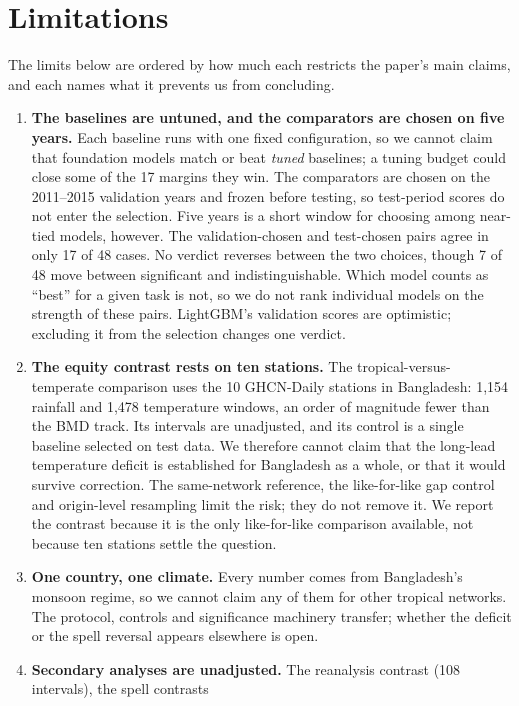 \section{Limitations}
\label{sec:limitations}

The limits below are ordered by how much each restricts the paper's main claims, and each names what it prevents
us from concluding.

\begin{enumerate}
  \item \textbf{The baselines are untuned, and the comparators are chosen on five years.} Each baseline runs with
    one fixed configuration, so we cannot claim that foundation models match or beat \emph{tuned} baselines; a
    tuning budget could close some of the 17 margins they win. The comparators are chosen on the 2011--2015
    validation years and frozen before testing, so test-period scores do not enter the selection. Five years is a
    short window for choosing among near-tied models, however. The validation-chosen and test-chosen pairs agree in
    only 17 of 48 cases. No verdict reverses between the two choices, though 7 of 48 move between significant and indistinguishable.
    Which model counts as ``best'' for a
    given task is not, so we do not rank individual models on the strength of these pairs. LightGBM's validation
    scores are optimistic; excluding it from the selection changes one verdict.
  \item \textbf{The equity contrast rests on ten stations.} The tropical-versus-temperate comparison uses the 10
    GHCN-Daily stations in Bangladesh: 1{,}154 rainfall and 1{,}478 temperature windows, an order of magnitude
    fewer than the BMD track. Its intervals are unadjusted, and its control is a single baseline selected on test
    data. We therefore cannot claim that the long-lead temperature deficit is established for Bangladesh as a
    whole, or that it would survive correction. The same-network reference, the like-for-like gap control and
    origin-level resampling limit the risk; they do not remove it. We report the contrast because it is the only
    like-for-like comparison available, not because ten stations settle the question.
  \item \textbf{One country, one climate.} Every number comes from Bangladesh's monsoon regime, so we cannot claim
    any of them for other tropical networks. The protocol, controls and significance machinery transfer; whether
    the deficit or the spell reversal appears elsewhere is open.
  \item \textbf{Secondary analyses are unadjusted.} The reanalysis contrast (108 intervals), the spell contrasts

\end{enumerate}
